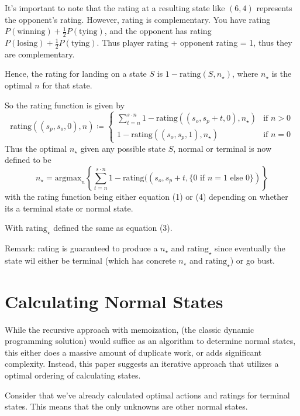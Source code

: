 \documentclass[a4paper]{article}
\begin{document}
It's important to note that the rating at a resulting state like $(6, 4)$ represents the opponent's rating. However, rating is complementary. You have rating $P(\text{winning}) + \frac{1}{2} P(\text{tying})$, and the opponent has rating $P(\text{losing}) + \frac{1}{2} P(\text{tying})$. Thus player rating + opponent rating = 1, thus they are complementary.

Hence, the rating for landing on a state $S$ is $1-\text{rating}(S, n_{\star})$, where $n_{\star}$ is the optimal $n$ for that state. 

So the rating function is given by
%
\begin{equation}
    \text{rating}((s_p, s_o, 0), n) \coloneqq \begin{cases}
        \sum_{t = n}^{s \cdot n} 1 - \text{rating}((s_o, s_p + t, 0), n_{\star}) & \text{if } n > 0 \\
        1- \text{rating}((s_o, s_p, 1), n_{\star}) & \text{if } n = 0
    \end{cases}
\end{equation}
%
Thus the optimal $n_{\star}$ given any possible state $S$, normal or terminal is now defined to be
%
$$
n_{\star} = \text{argmax}_{n} \left\{\sum_{t = n}^{s \cdot n} 1 - \text{rating}((s_o, s_p + t, \{0 \text{ if } n = 1 \text{ else } 0\}) \right\}
$$
%
with the rating function being either equation (1) or (4) depending on whether its a terminal state or normal state.

With $\text{rating}_{\star}$ defined the same as equation (3).

Remark: rating is guaranteed to produce a $n_{\star}$ and $\text{rating}_{\star}$ since eventually the state wil either be terminal (which has concrete $n_{\star}$ and $\text{rating}_{\star}$) or go bust.


\section{Calculating Normal States}

While the recursive approach with memoization, (the classic dynamic programming solution) would suffice as an algorithm to determine normal states, this either does a massive amount of duplicate work, or adds significant complexity. Instead, this paper suggests an iterative approach that utilizes a optimal ordering of calculating states.  

Consider that we've already calculated optimal actions and ratings for terminal states. This means that the only unknowns are other normal states. 
\end{document}
